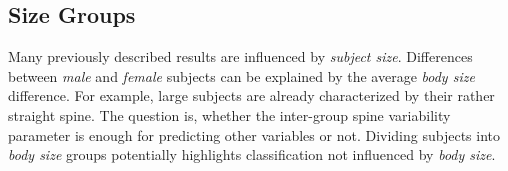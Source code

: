 \documentclass[a4paper,twoside]{style/article}
\newcommand{\com}[1]{\textcolor{orange}{\uline{#1}}}
\begin{document}
%
%

\subsection{Size Groups}
Many previously described results are influenced by \emph{subject size}.
Differences between \emph{male} and \emph{female} subjects can be explained by the average \emph{body size} difference.
For example, large subjects are already characterized by their rather straight spine.
%
The question is, whether the inter-group spine variability parameter is enough for predicting other variables or not.
Dividing subjects into \emph{body size} groups potentially highlights classification not influenced by \emph{body size}.
\end{document}
